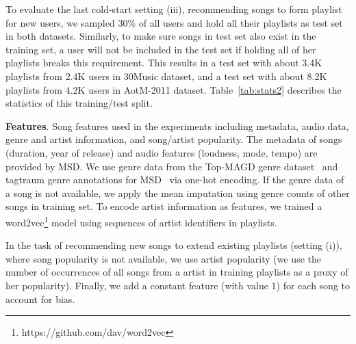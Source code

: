 To evaluate the last cold-start setting (iii), \ie recommending songs to form playlist for new users,
we sampled 30\% of all users and hold all their playlists as test set in both datasets.
Similarly, to make sure songs in test set also exist in the training set,
a user will not be included in the test set if holding all of her playlists breaks this requirement.
This results in a test set with about 3.4K playlists from 2.4K users in 30Music dataset,
and a test set with about 8.2K playlists from 4.2K users in AotM-2011 dataset.
Table~\ref{tab:stats2} describes the statistics of this training/test split.


{\bf Features}.
Song features used in the experiments including metadata, audio data, genre and artist information, and song/artist popularity.
%
The metadata of songs (\eg duration, year of release) and audio features (\eg loudness, mode, tempo) are provided by MSD.
We use genre data from the Top-MAGD genre dataset~\cite{schindler2012facilitating}
and tagtraum genre annotations for MSD~\cite{schreiber2015improving} via one-hot encoding.
If the genre data of a song is not available, we apply the mean imputation using genre counts of other songs in training set.
To encode artist information as features,
we trained a word2vec\footnote{https://github.com/dav/word2vec} model using sequences of artist identifiers in playlists.

In the task of recommending new songs to extend existing playlists (setting (i)), where song popularity is not available,
we use artist popularity (we use the number of occurrences of all songs from a artist in training playlists as a proxy of her popularity).
Finally, we add a constant feature (with value $1$) for each song to account for bias.


